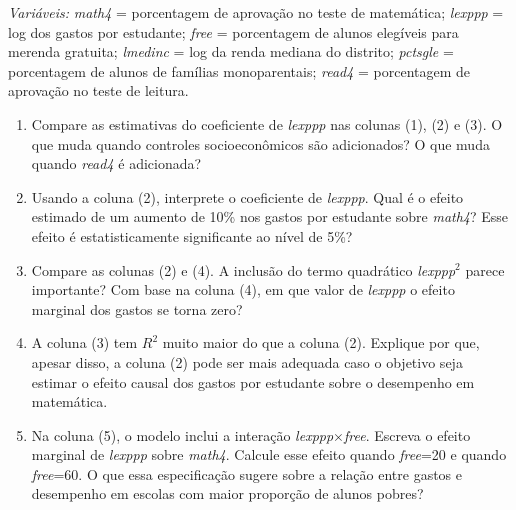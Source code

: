 \documentclass[12pt,letterpaper,onecolumn]{exam}
\begin{document}
\begin{questions}
\noindent \textit{Variáveis:} \textit{math4} = porcentagem de aprovação no teste de matemática; \textit{lexppp} = log dos gastos por estudante; \textit{free} = porcentagem de alunos elegíveis para merenda gratuita; \textit{lmedinc} = log da renda mediana do distrito; \textit{pctsgle} = porcentagem de alunos de famílias monoparentais; \textit{read4} = porcentagem de aprovação no teste de leitura.

\begin{enumerate}[label=(\alph*)]
    \item Compare as estimativas do coeficiente de \textit{lexppp} nas colunas (1), (2) e (3). O que muda quando controles socioeconômicos são adicionados? O que muda quando \textit{read4} é adicionada?
    \item Usando a coluna (2), interprete o coeficiente de \textit{lexppp}. Qual é o efeito estimado de um aumento de 10\% nos gastos por estudante sobre \textit{math4}? Esse efeito é estatisticamente significante ao nível de 5\%?
    \item Compare as colunas (2) e (4). A inclusão do termo quadrático \textit{lexppp}\(^2\) parece importante? Com base na coluna (4), em que valor de \textit{lexppp} o efeito marginal dos gastos se torna zero?
    \item A coluna (3) tem \(R^2\) muito maior do que a coluna (2). Explique por que, apesar disso, a coluna (2) pode ser mais adequada caso o objetivo seja estimar o efeito causal dos gastos por estudante sobre o desempenho em matemática.
    \item Na coluna (5), o modelo inclui a interação \textit{lexppp}\(\times\)\textit{free}. Escreva o efeito marginal de \textit{lexppp} sobre \textit{math4}. Calcule esse efeito quando \textit{free}=20 e quando \textit{free}=60. O que essa especificação sugere sobre a relação entre gastos e desempenho em escolas com maior proporção de alunos pobres?
\end{enumerate}

\end{questions}
\end{document}

